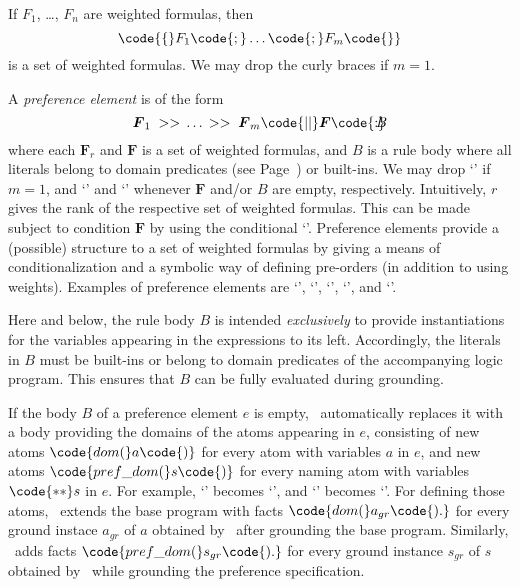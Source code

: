 If $F_1$, \ldots, $F_n$ are weighted formulas, then
\[
\code{\{}F_1\code{;}\dots\code{;}F_m\code{\}}
\]
is a set of weighted formulas.
We may drop the curly braces if $m=1$.

A \emph{preference element} is of the form
\[\boldsymbol{F}_1\; >> \,\dots\, >> \;\boldsymbol{F}_m\code{ || }\boldsymbol{F}\code{ : }\!\!\!\! B\]
where each $\boldsymbol{F}_r$ and $\boldsymbol{F}$ is a set of weighted formulas, 
and $B$ is a rule body where all literals belong to domain predicates
(see Page~\pageref{pg:domain}) or built-ins.
%
We may drop `\code{>>}' if $m=1$, 
and `' and `' whenever $\boldsymbol{F}$ and/or $B$ are empty, respectively.
%
Intuitively, $r$ gives the rank of the respective set of weighted formulas.
This can be made subject to condition $\boldsymbol{F}$ by using the conditional `\code{||}'.
Preference elements provide a (possible) structure to a set of weighted formulas
by giving a means of conditionalization and a symbolic way of defining pre-orders (in addition to using weights).
%
%
Examples of preference elements are 
`', 
`',  
`', 
`',  and
`'.

\begin{note}
Here and below, 
the rule body $B$ is intended \emph{exclusively} to provide instantiations for the variables appearing in the expressions to its left.  
Accordingly, the literals in $B$ must be built-ins or belong to domain predicates of the accompanying logic program.
This ensures that $B$ can be fully evaluated during grounding.
\end{note}

\begin{note}\label{asprin:nobody}
If the body $B$ of a preference element $e$ is empty,
\asprin\ automatically replaces it with a body 
providing the domains of the atoms appearing in $e$,
consisting of new atoms $\code{dom(}a\code{)}$ 
for every atom with variables $a$ in $e$, 
and new atoms $\code{pref\_dom(}s\code{)}$ 
for every naming atom with variables $\code{**}s$ in $e$.
%
For example, 
`' becomes
`', and 
`' becomes
`'.
%
For defining those atoms, 
\asprin\ extends the base program with facts 
$\code{dom(}a_{gr}\code{).}$ for every ground instace $a_{gr}$ of $a$ obtained by \clingo\
after grounding the base program.
%
Similarly, \asprin\ adds facts  
$\code{pref\_dom(}s_{gr}\code{).}$
for every ground instance $s_{gr}$ of $s$ obtained by \clingo\
while grounding the preference specification.
\end{note}

